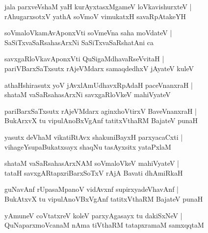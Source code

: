 \documentclass[twoside,12pt,openright]{book}
\newcounter{shloka}[chapter]
\begin{document}
\begin{shloka}
jala parxveVshaM yaH kurAyxtasxMgameV loVkavishurxteV |\\
rAhugarxsotxV yathA soVmoV vimukatxH savaRpAtakeYH
\end{shloka}

\begin{shloka}
soVmaloVkamAvAponxVti soVmeVna saha moVdateV |\\
SaSiTxvaSaRsahasArxNi SaSiTxvaSaRshatAni ca 
\end{shloka}

\begin{shloka}
savxgaRloVkavAponxVti QuSigaMdhavaRseVvitaH |\\
pariVBarxSaTxsutx rAjeVMdarx samaqdedhxV jAyateV kuleV 
\end{shloka}

\begin{shloka}
athaHshirasutx yoV jAvxlAmUdhavxRpAdaH paceVnanxraH |\\
shataM vaSaRsahasArxNi savxgaRloVkeV mahiVyateV 
\end{shloka}

\begin{shloka}
pariBarxSaTxsutx rAjeVMdarx aginxhoVtirxV BaveVnanxraH |\\
BukArxvX tu vipulAnoBxVgAnf tatitxVthaRM BajateV punaH 
\end{shloka}

\begin{shloka}
yasutx deVhaM vikatiRtAvx shakuniBayxH parxyacaCxti |\\
vihageYsupaBukatxsayx shaqNu tasAyxsitx yataPxlaM 
\end{shloka}

\begin{shloka}
shataM vaSaRsahasArxNAM soVmaloVkeV mahiVyateV |\\
tataH savxgARtapxriBarxSoTxV rAjA Bavati dhAmiRkaH
\end{shloka}

\begin{shloka}
guNavAnf rUpasaMpanoV vidAvxnf supirxyadeVhavAnf |\\
BukAtxvX tu vipulAnoVBxVgAnf tatitxVthaRM BajateV punaH 
\end{shloka}

\begin{shloka}
yAmuneV coVtatxreV koleV parxyAgasayx tu dakiSxNeV |\\
QuNaparxmoVcanaM nAma tiVthaRM tatapxramaM samxqqtaM 
\end{shloka}
\end{document}
